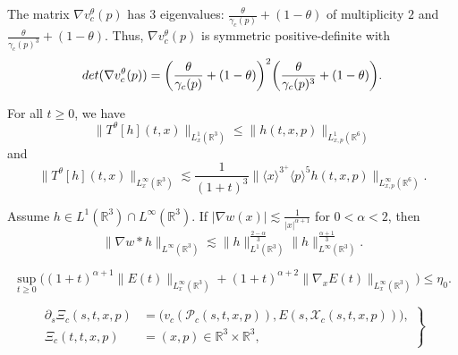 \documentclass[10pt,a4paper]{amsart}
\begin{document}
\begin{lemma}\label{lemma: Ac eigenvalues}
The matrix $\nabla v_c^\theta(p)$ has 3 eigenvalues: $\frac{\theta}{\gamma_c(p)}+(1-\theta)$ of multiplicity $2$ and $\frac{\theta}{\gamma_c(p)^3}+(1-\theta)$. Thus, $\nabla v_c^\theta(p)$ is symmetric positive-definite with
$$\textup{det}(\nabla v_c^\theta(p))=\bigg(\frac{\theta}{\gamma_c(p)}+(1-\theta)\bigg)^2\bigg(\frac{\theta}{\gamma_c(p)^3}+(1-\theta)\bigg).$$ 
\end{lemma}

\begin{lemma}\label{lemma: dispersive bounds for the free flow associated with interpolated v}
For all $t\geq0$, we have
\begin{equation}\label{eq: dispersive bounds for the free flow associated with interpolated v-1}
\big\|T^\theta[h](t,x)\big\|_{L_x^1(\mathbb{R}^3)}\leq \|h(t,x,p)\|_{L_{x,p}^1(\mathbb{R}^6)}
\end{equation}
and
\begin{equation}
\label{eq: dispersive bounds for the free flow associated with interpolated v-2}
\big\|T^\theta[h](t,x)\big\|_{L_x^\infty(\mathbb{R}^3)}\lesssim \frac{1}{(1+t)^3}\Big\|\langle x\rangle^{3^+}\langle p\rangle^5 h(t,x,p)\Big\|_{L_{x,p}^\infty(\mathbb{R}^6)}.
\end{equation}
\end{lemma}

\begin{lemma}
\label{lemma: interpolation inequality}
Assume $h \in L^1(\mathbb{R}^3) \cap L^\infty(\mathbb{R}^3)$. If $|\nabla w(x)|\lesssim\frac{1}{|x|^{\alpha+1}}$ for $0<\alpha<2$, then 
$$\|\nabla w*h\|_{L^\infty(\mathbb{R}^3)}\lesssim \|h\|_{L^1(\mathbb{R}^3)}^{\frac{2-\alpha}{3}}\|h\|_{L^\infty(\mathbb{R}^3)}^{\frac{\alpha+1}{3}}.$$
\end{lemma}

\begin{equation}\label{eq: small force field assumption}
\sup_{t\geq0}\Big((1+t)^{\alpha+1}\|E(t)\|_{L_x^\infty(\mathbb{R}^3)}+(1+t)^{\alpha+2}\|\nabla _xE(t)\|_{L_x^\infty(\mathbb{R}^3)}\Big)\leq\eta_0.
\end{equation}

\begin{equation}\label{eq: r-ODE}
\left.
\begin{aligned}
\partial_s\Xi_c(s,t,x,p)&=\big(v_c(\mathcal{P}_c(s,t,x,p)), E(s,\mathcal{X}_c(s,t,x,p))\big),\\
\Xi_c(t,t,x,p)&=(x,p)\in\mathbb{R}^3\times\mathbb{R}^3,
\end{aligned}
\right \}
\end{equation}
\end{document}

